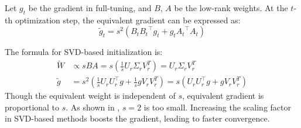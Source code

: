 \begin{lemma}\label{th:tidle_g}
Let \( g_t \) be the gradient in full-tuning, and \( B \), \( A \) be the low-rank weights. At the \( t \)-th optimization step, the equivalent gradient can be expressed as:
\begin{equation}
    \tilde{g}_t = s^2 \left( B_t {B_t}^\top g_t + g_t {A_t}^\top A_t \right) \label{eq:tg}
\end{equation}
\end{lemma}

The formula for SVD-based initialization is:
\begin{align}
\tilde{W} &\propto sBA = s \left( \frac{1}{s} U_{r} \Sigma_{r} V_{r}^T \right) = U_{r} \Sigma_{r} V_{r}^T \\
\tilde{g} &= s^2 \left(  \frac{1}{s} U_{r} U_{r}^\top g +  \frac{1}{s} g V_{r} V_{r}^T \right) = s \left( U_{r} U_{r}^\top g +  g V_{r} V_{r}^T \right)
\end{align}
Though the equivalent weight is independent of \( s \), equivalent gradient is proportional to \( s \). As shown in , \( s = 2 \) is too small. Increasing the scaling factor in SVD-based methods boosts the gradient, leading to faster convergence.

